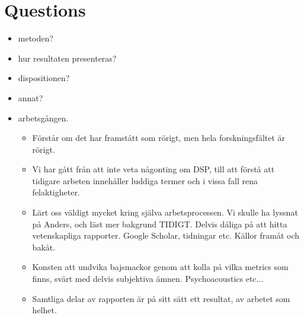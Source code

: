 \documentclass[../main2.tex]{subfiles}
\begin{document}
 

\section{Questions}
\begin{itemize}
\item metoden?
\item hur resultaten presenteras?
\item dispositionen?
\item annat?
\item arbetsgången.
\begin{itemize}
	\item Förstår om det har framstått som rörigt, men hela forskningsfältet är rörigt.
	\item Vi har gått från att inte veta någonting om DSP, till att förstå att tidigare arbeten innehåller luddiga termer och i vissa fall rena felaktigheter.
	\item Lärt oss väldigt mycket kring själva arbetsprocessen. Vi skulle ha lyssnat på Anders, och läst mer bakgrund TIDIGT. Delvis dåliga på att hitta vetenskapliga rapporter. Google Scholar, tidningar etc. Källor framåt och bakåt.
	\item Konsten att undvika bajsmackor genom att kolla på vilka metrics som finns, svårt med delvis subjektiva ämnen. Psychoacoustics etc...
	\item Samtliga delar av rapporten är på sitt sätt ett resultat, av arbetet som helhet. 
\end{itemize}
\end{itemize}
\end{document}
